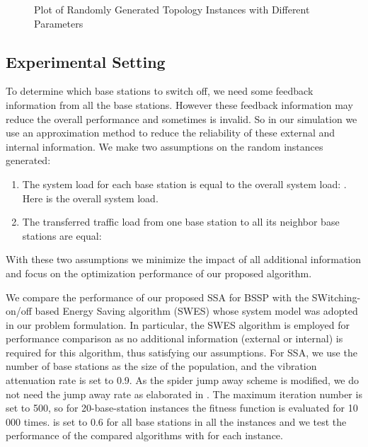 \documentclass[conference]{IEEEtran}
\begin{document}
\begin{figure}
  \center
 
 
  \caption{Plot of Randomly Generated Topology Instances with Different Parameters}
  \label{fig:instance}
\end{figure}

\subsection{Experimental Setting}
To determine which base stations to switch off, we need some feedback information from all the base stations. However these feedback information may reduce the overall performance and sometimes is invalid. So in our simulation we use an approximation method to reduce the reliability of these external and internal information. We make two assumptions on the random instances generated:
\begin{enumerate}
\item The system load for each base station is equal to the overall system load: . Here  is the overall system load.
\item The transferred traffic load from one base station to all its neighbor base stations are equal: 
\end{enumerate}
With these two assumptions we minimize the impact of all additional information and focus on the optimization performance of our proposed algorithm.

We compare the performance of our proposed SSA for BSSP with the SWitching-on/off based Energy Saving algorithm (SWES) \cite{OhSonKrishnamachari2013DynamicBaseStation} whose system model was adopted in our problem formulation. In particular, the SWES algorithm is employed for performance comparison as no additional information (external or internal) is required for this algorithm, thus satisfying our assumptions. For SSA, we use the number of base stations as the size of the population, and the vibration attenuation rate is set to 0.9. As the spider jump away scheme is modified, we do not need the jump away rate as elaborated in \cite{YuLi2013SocialSpiderAlgorithm}. The maximum iteration number is set to 500, so for 20-base-station instances the fitness function is evaluated for 10 000 times.  is set to 0.6 for all base stations in all the instances and we test the performance of the compared algorithms with  for each instance.
\end{document}
